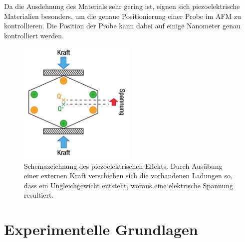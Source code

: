 Da die Ausdehnung des Materials sehr gering ist, eignen sich piezoelektrische Materialien besonders, um die genaue Positionierung einer Probe im AFM zu kontrollieren. Die Position der Probe kann dabei auf einige Nanometer genau kontrolliert werden.
\begin{figure}
  \centering
  \includegraphics[width=0.5\textwidth]{content/plots/Piezo.jpg}
  \caption{Schemazeichnung des piezoelektrischen Effekts. Durch Ausübung einer externen Kraft verschieben sich die vorhandenen Ladungen so, dass ein Ungleichgewicht entsteht, woraus eine elektrische Spannung resultiert.\cite{afm_datasheet}}
  \label{fig:piezo}
\end{figure}
%
\section{Experimentelle Grundlagen}
